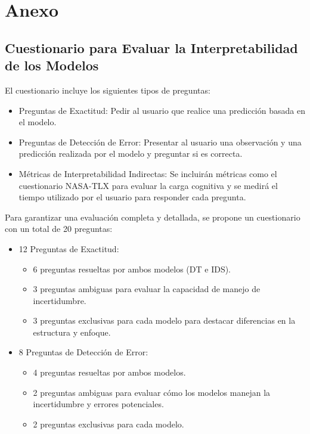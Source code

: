 \chapter{Anexo}

\section{Cuestionario para Evaluar la Interpretabilidad de los Modelos}

El cuestionario incluye los siguientes tipos de preguntas:
\begin{itemize}
    \item Preguntas de Exactitud: Pedir al usuario que realice una predicción basada en el modelo.
    \item Preguntas de Detección de Error: Presentar al usuario una observación y una predicción realizada por el modelo y preguntar si es correcta.
    \item Métricas de Interpretabilidad Indirectas: Se incluirán métricas como el cuestionario NASA-TLX para evaluar la carga cognitiva y se medirá el tiempo utilizado por el usuario para responder cada pregunta.
\end{itemize}

Para garantizar una evaluación completa y detallada, se propone un cuestionario con un total de 20 preguntas:
\begin{itemize}
    \item 12 Preguntas de Exactitud:
    \begin{itemize}
        \item 6 preguntas resueltas por ambos modelos (DT e IDS).
        \item 3 preguntas ambiguas para evaluar la capacidad de manejo de incertidumbre.
        \item 3 preguntas exclusivas para cada modelo para destacar diferencias en la estructura y enfoque.
    \end{itemize}
    \item 8 Preguntas de Detección de Error:
    \begin{itemize}
        \item 4 preguntas resueltas por ambos modelos.
        \item 2 preguntas ambiguas para evaluar cómo los modelos manejan la incertidumbre y errores potenciales.
        \item 2 preguntas exclusivas para cada modelo.
    \end{itemize}
\end{itemize}

